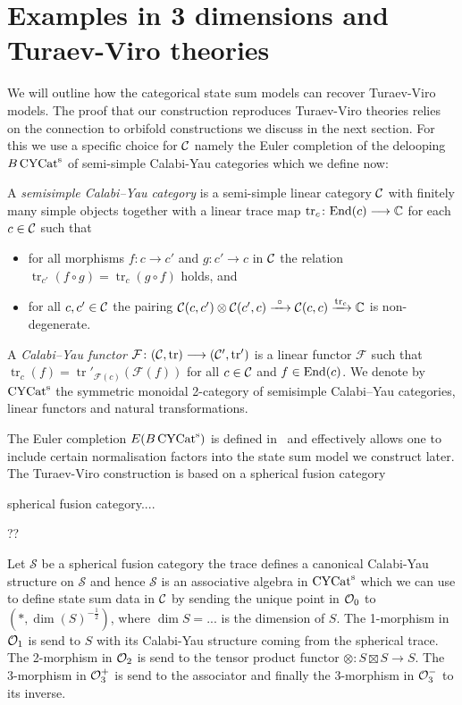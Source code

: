 \section{Examples in 3 dimensions and Turaev-Viro theories}\label{sec:3D}
We will outline how the categorical state sum models can recover Turaev-Viro models. The proof that our construction reproduces Turaev-Viro theories relies on the connection to orbifold constructions we discuss in the next section.
For this we use a specific choice for $\mathcal{C}$ namely the Euler completion of the delooping $B\operatorname{\mathrm{CYCat}^s}$ of semi-simple Calabi-Yau categories which we define now:

\begin{definition}
	A \emph{semisimple Calabi--Yau category} is a semi-simple linear category $\mathcal{C}$ with finitely many simple objects together with a linear
	trace map $\operatorname{tr}_c \colon \mathrm{End} (c) \longrightarrow \mathbb{C}$ for each $c\in \mathcal{C}$ such that
	\begin{itemize}
		\item
		for all morphisms $f\colon c \longrightarrow c'$ and $g\colon c' \longrightarrow c$ in $\mathcal{C}$ the relation $\operatorname{tr}_{c'}(f\circ g)= \operatorname{tr}_c({g\circ f})$ holds, and
		\item
		for all $c,c'\in \mathcal{C}$ the pairing $\mathcal{C}(c,c') \otimes \mathcal{C}(c',c) \xrightarrow{\  \circ  \ } \mathcal{C}(c,c) \xrightarrow{\operatorname{tr}_c} \mathbb{C}$ is non-degenerate.
	\end{itemize}
	A \emph{Calabi--Yau functor} $\mathcal{F} \colon (\mathcal{C}, \operatorname{tr}) \longrightarrow (\mathcal{C}' , \operatorname{tr}')$ is a linear functor $\mathcal{F}$ such that $\operatorname{tr}_c(f)= \operatorname{tr}'_{\mathcal{F}(c)}(\mathcal{F}(f)) $ for all $c\in \mathcal{C}$ and $f\in \mathrm{End}(c)$. We denote by
	$\operatorname{\mathrm{CYCat}^s}$ the symmetric monoidal 2-category of semisimple Calabi--Yau categories, linear functors and natural transformations.
\end{definition}

The Euler completion $E(B\operatorname{\mathrm{CYCat}^s})$ is defined in~\cite{3DOrb} and effectively allows one to include certain normalisation factors into the state sum model we construct later.
The Turaev-Viro construction is based on a spherical fusion category
\begin{definition}
    spherical fusion category....
\end{definition}
\begin{example}
    ??
\end{example}
Let $\mathcal{S}$ be a spherical fusion category the trace defines a canonical Calabi-Yau structure on $\mathcal{S}$ and hence $\mathcal{S}$ is an associative algebra in $\operatorname{\mathrm{CYCat}^s}$ which we can use to define state sum data in $\mathcal{C}$ by sending the unique point in $\mathcal{O}_0$ to $(*,\dim (S)^{-\tfrac{1}{2}})$, where $\dim S = ...$ is the dimension of $S$. The 1-morphism in $\mathcal{O}_1$ is send to $S$ with its Calabi-Yau structure coming from the spherical trace. The 2-morphism in $\mathcal{O}_2$ is send to the tensor product functor $\otimes \colon S\boxtimes S \to S$. The 3-morphism in $\mathcal{O}_3^+$ is send to the associator and finally the 3-morphism in $\mathcal{O}_3^-$ to its inverse.